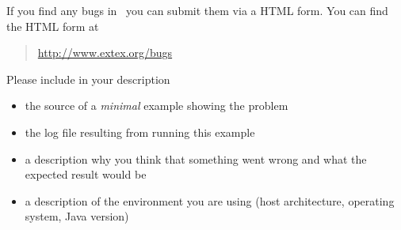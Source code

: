 If you find any bugs in \ExTeX\ you can submit them 
via a HTML form.
You can find the HTML form at
\begin{quotation}
  \url{http://www.extex.org/bugs}
\end{quotation}

Please include in your description 
\begin{itemize}
\item the source of a \emph{minimal} example showing the problem
\item the log file resulting from running this example
\item a description why you think that something went wrong and what
  the expected result would be
\item a description of the environment you are using (host
  architecture, operating system, Java version)
\end{itemize}

\endinput
%
